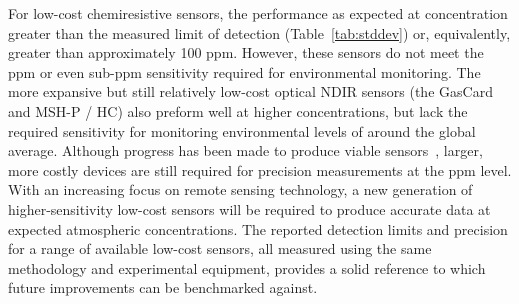 \documentclass[sensors,article,submit,moreauthors,pdftex]{Definitions/mdpi}
\begin{document}
		
		For low-cost chemiresistive  sensors, the performance as expected at concentration greater than the measured limit of detection (Table~\ref{tab:stddev}) or, equivalently, greater than approximately 100 ppm.
		However, these sensors do not meet the ppm or even sub-ppm sensitivity required for environmental monitoring.
		The more expansive but still relatively low-cost optical NDIR  sensors (the GasCard  and  MSH-P / HC) also preform well at higher concentrations, but lack the required sensitivity for monitoring environmental levels of  around the global average.
		Although progress has been made to produce viable sensors~\cite{zhu_one_2012}, larger, more costly devices are still required for precision measurements at the ppm level.
		With an increasing focus on remote sensing technology, a new generation of higher-sensitivity low-cost  sensors will be required to produce accurate data at expected atmospheric concentrations.
		The reported detection limits and precision for a range of available low-cost sensors, all measured using the same methodology and experimental equipment, provides a solid reference to which future improvements can be benchmarked against.
		
	
	
	
	
\end{document}
